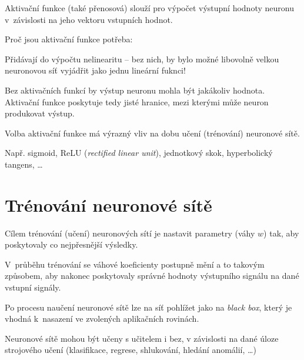 \begin{compactitem}
    \item Aktivační funkce (také přenosová) slouží pro výpočet výstupní hodnoty neuronu v~závislosti na jeho vektoru vstupních hodnot.

    \item Proč jsou aktivační funkce potřeba:\begin{compactitem}

        \item Přidávají do výpočtu nelinearitu -- bez nich, by bylo možné libovolně velkou neuronovou síť vyjádřit jako jednu lineární fuknci!

        \item Bez aktivačních funkcí by výstup neuronu mohla být jakákoliv hodnota. Aktivační funkce poskytuje tedy jisté hranice, mezi kterými může neuron produkovat výstup.
    \end{compactitem}

    \item Volba aktivační funkce má výrazný vliv na dobu učení (trénování) neuronové sítě.

    \item Např. sigmoid, ReLU (\textit{rectified linear unit}), jednotkový skok, hyperbolický tangens, \dots
\end{compactitem}


\section{Trénování neuronové sítě}

\begin{compactitem}
    \item Cílem trénování (učení) neuronových sítí je nastavit parametry (váhy $w$) tak, aby poskytovaly co nejpřesnější výsledky.

    \item V~průběhu trénování se váhové koeficienty postupně mění a to takovým způsobem, aby nakonec poskytovaly správné hodnoty výstupního signálu na dané vstupní signály.

    \item Po procesu naučení neuronové sítě lze na síť pohlížet jako na \textit{black box}, který je vhodná k~nasazení ve zvolených aplikačních rovinách.

    \item Neuronové sítě mohou být učeny s učitelem i bez, v závislosti na dané úloze strojového učení (klasifikace, regrese, shlukování, hledání anomálií, \dots)
\end{compactitem}

